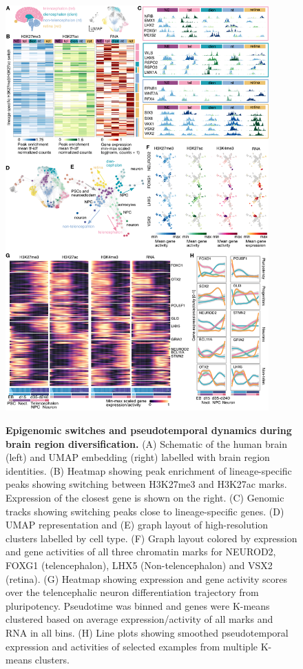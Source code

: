 \begin{figure}[b!]
    \centering
	\includegraphics[width=0.9\textwidth]{figures/cnt/Figure_2}
    \label{fig:cnt2}
\end{figure}

\begin{figure}[t!]
    \caption{\textbf{Epigenomic switches and pseudotemporal dynamics during brain region diversification.}
    (A) Schematic of the human brain (left) and UMAP embedding (right) labelled with brain region identities. (B) Heatmap showing peak enrichment of lineage-specific peaks showing switching between H3K27me3 and H3K27ac marks. Expression of the closest gene is shown on the right. (C) Genomic tracks showing switching peaks close to lineage-specific genes. (D) UMAP representation and (E) graph layout of high-resolution clusters labelled by cell type. (F) Graph layout colored by expression and gene activities of all three chromatin marks for NEUROD2, FOXG1 (telencephalon), LHX5 (Non-telencephalon) and VSX2 (retina). (G) Heatmap showing expression and gene activity scores over the telencephalic neuron differentiation trajectory from pluripotency. Pseudotime was binned and genes were K-means clustered based on average expression/activity of all marks and RNA in all bins. (H) Line plots showing smoothed pseudotemporal expression and activities of selected examples from multiple K-means clusters.}
\end{figure}

